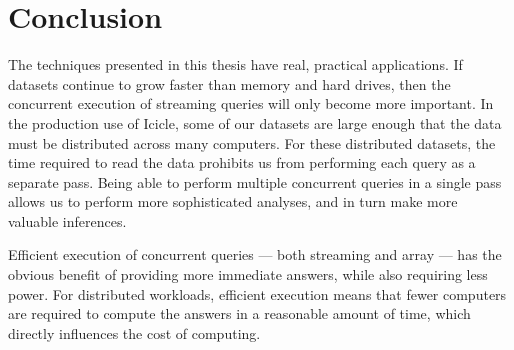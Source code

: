 \section{Conclusion}

The techniques presented in this thesis have real, practical applications.
If datasets continue to grow faster than memory and hard drives, then the concurrent execution of streaming queries will only become more important.
In the production use of Icicle, some of our datasets are large enough that the data must be distributed across many computers.
For these distributed datasets, the time required to read the data prohibits us from performing each query as a separate pass.
Being able to perform multiple concurrent queries in a single pass allows us to perform more sophisticated analyses, and in turn make more valuable inferences.

Efficient execution of concurrent queries --- both streaming and array --- has the obvious benefit of providing more immediate answers, while also requiring less power.
For distributed workloads, efficient execution means that fewer computers are required to compute the answers in a reasonable amount of time, which directly influences the cost of computing.


% 
% 



